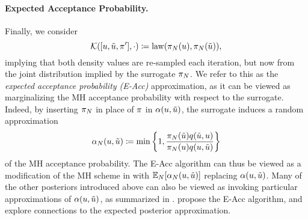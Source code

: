\documentclass[12pt]{article}
\begin{document}
\paragraph{Expected Acceptance Probability.}
Finally, we consider
\begin{equation}
\postSampleKernel([\Par, \propPar, \postDens^\prime], \cdot)
\Def \mathrm{law}(\postEm[\Ndesign](\Par), \postEm[\Ndesign](\propPar)),
\end{equation}
implying that both density values are re-sampled each iteration, but now from
the joint distribution implied by the surrogate $\postEm[\Ndesign]$. 
We refer to this as the \textit{expected acceptance probability (E-Acc)} approximation,
as it can be viewed as marginalizing the MH acceptance probability with respect
to the surrogate. Indeed, by inserting $\postEm[\Ndesign]$
in place of $\postDens$ in $\accProbMH(\Par, \propPar)$, the surrogate induces a random 
approximation
\begin{equation}
\accProbMHEm[\Ndesign](\Par, \propPar) 
\Def \min\left\{1, \frac{\postEm[\Ndesign](\propPar)\propDens(\propPar, \Par)}{\postEm[\Ndesign](\Par) \propDens(\Par, \propPar)} \right\}
\label{eq:MH-prob-surrogate}
\end{equation}
of the MH acceptance probability. The E-Acc algorithm can thus be viewed as a modification of the
MH scheme in  with $\E_{\Ndesign}[\accProbMHEm[\Ndesign](\Par, \propPar)]$
replacing $\accProbMH(\Par, \propPar)$. Many of the other posteriors introduced above can also
be viewed as invoking particular approximations of $\accProbMH(\Par, \propPar)$, as summarized
in . \citet{surrogateNoisyMCMC} propose the E-Acc algorithm, 
and explore connections to the expected posterior approximation.
\end{document}
